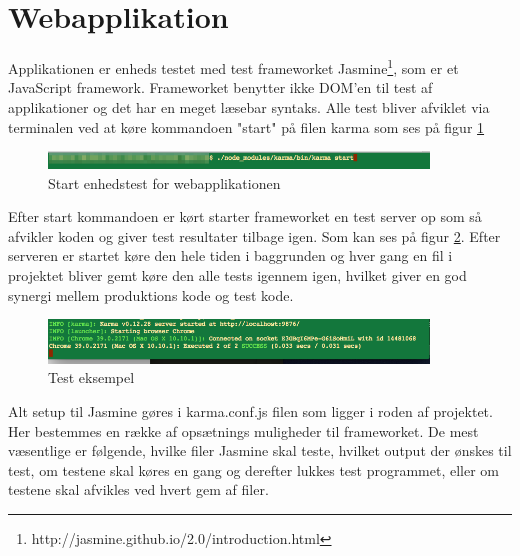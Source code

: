 \section{Webapplikation}
Applikationen er enheds testet med test frameworket Jasmine\footnote{http://jasmine.github.io/2.0/introduction.html}, som er et JavaScript framework. Frameworket benytter ikke DOM'en til test af applikationer og det har en meget læsebar syntaks. Alle test bliver afviklet via terminalen ved at køre kommandoen "start" på filen karma som ses på figur \ref{fig:run_test}

\begin{figure}[H]
	\centering
	\includegraphics[width=0.9\textwidth]{Billeder/Test/run_test.png}
	\vspace{-0.0cm}
	\caption{Start enhedstest for webapplikationen}
	\label{fig:run_test}
\end{figure}

Efter start kommandoen er kørt starter frameworket en test server op som så afvikler koden og giver test resultater tilbage igen. Som kan ses på figur \ref{fig:test_eksempel}. Efter serveren er startet køre den hele tiden i baggrunden og hver gang en fil i projektet bliver gemt køre den alle tests igennem igen, hvilket giver en god synergi mellem produktions kode og test kode.  

\begin{figure}[H]
	\centering
	\includegraphics[width=0.9\textwidth]{Billeder/Test/test_exampel.png}
	\vspace{-0.0cm}
	\caption{Test eksempel}
	\label{fig:test_eksempel}
\end{figure}

Alt setup til Jasmine gøres i karma.conf.js filen som ligger i roden af projektet. Her bestemmes en række af opsætnings muligheder til frameworket. De mest væsentlige er følgende, hvilke filer Jasmine skal teste, hvilket output der ønskes til test, om testene skal køres en gang og derefter lukkes test programmet, eller om testene skal afvikles ved hvert gem af filer. 